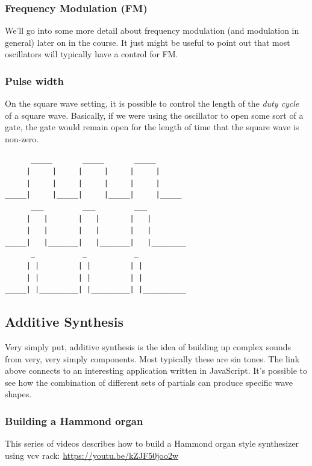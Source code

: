 \documentclass[11pt]{article}
\begin{document}
\subsubsection{Frequency Modulation (FM)}
\label{sec:org0585770}
We'll go into some more detail about frequency modulation (and
modulation in general) later on in the course. It just might be
useful to point out that most oscillators will typically have a
control for FM.

\subsubsection{Pulse width}
\label{sec:org559f3ce}
On the square wave setting, it is possible to control the length of
the \emph{duty cycle} of a square wave. Basically, if we were using the
oscillator to open some sort of a gate, the gate would remain open for
the length of time that the square wave is non-zero. 

\begin{verbatim}
      _____       _____       _____
     |     |     |     |     |     |
     |     |     |     |     |     |
_____|     |_____|     |_____|     |_____
      ___         ___         ___
     |   |       |   |       |   |
     |   |       |   |       |   |
_____|   |_______|   |_______|   |________
      _           _           _
     | |         | |         | |
     | |         | |         | |
_____| |_________| |_________| |__________

\end{verbatim}

\subsection{Additive Synthesis}
\label{sec:orga3be641}
Very simply put, additive synthesis is the idea of building up complex
sounds from very, very simply components. Most typically these are sin
tones. The link above connects to an interesting application written
in JavaScript. It's possible to see how the combination of different
sets of partials can produce specific wave shapes. 

\subsubsection{Building a Hammond organ}
\label{sec:org15af980}
This series of videos describes how to build a Hammond organ style
synthesizer using vcv rack: \url{https://youtu.be/kZJF50joo2w}
\end{document}
